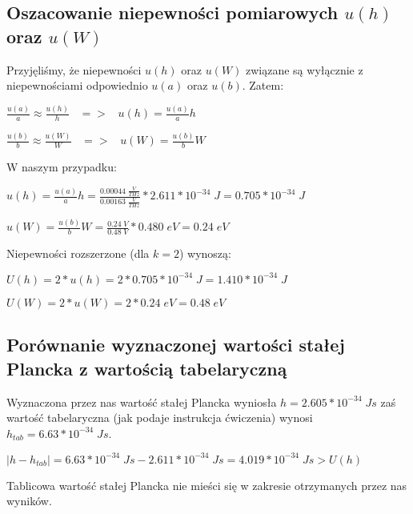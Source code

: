 \documentclass[12pt]{article}
\begin{document}
\subsection{Oszacowanie niepewności pomiarowych $u(h)$ oraz $u(W)$}
Przyjęliśmy, że niepewności $u(h)$ oraz $u(W)$ związane są wyłącznie z niepewnościami odpowiednio $u(a)$ oraz $u(b)$. Zatem:
\begin{center}
\Large $\frac{u(a)}{a}\approx\frac{u(h)}{h}\;\;\;=>\;\;\;u(h)=\frac{u(a)}{a}h$
\end{center}
\begin{center}
\Large $\frac{u(b)}{b}\approx\frac{u(W)}{W}\;\;\;=>\;\;\;u(W)=\frac{u(b)}{b}W$
\end{center}
W naszym przypadku:
\begin{center}
\Large $u(h)=\frac{u(a)}{a}h=\frac{0.00044\;\frac{V}{THz}}{0.00163\;\frac{V}{THz}}*2.611*10^{-34}\;J=0.705*10^{-34}\;J$
\end{center}
\begin{center}
\Large $u(W)=\frac{u(b)}{b}W=\frac{0.24\;V}{0.48\;V}*0.480\;eV=0.24\;eV$
\end{center}
Niepewności rozszerzone (dla $k=2$) wynoszą:
\begin{center}
\Large $U(h)=2*u(h)=2*0.705*10^{-34}\;J=1.410*10^{-34}\;J$
\end{center}
\begin{center}
\Large $U(W)=2*u(W)=2*0.24\;eV=0.48\;eV$
\end{center}
\subsection{Porównanie wyznaczonej wartości stałej Plancka z wartością tabelaryczną}
Wyznaczona przez nas wartość stałej Plancka wyniosła $h=2.605*10^{-34}\;Js$ zaś wartość tabelaryczna (jak podaje instrukcja ćwiczenia) wynosi 
$h_{tab}=6.63*10^{-34}\;Js$.
\begin{center}
\Large $|h-h_{tab}|=6.63*10^{-34}\;Js-2.611*10^{-34}\;Js=4.019*10^{-34}\;Js > U(h)$
\end{center}
Tablicowa wartość stałej Plancka nie mieści się w zakresie otrzymanych przez nas wyników. \newpage
\end{document}
